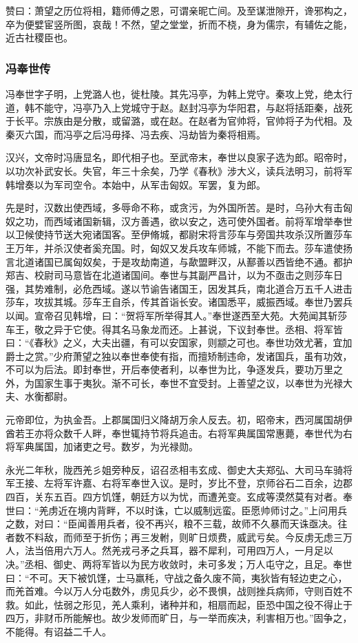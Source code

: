 \documentclass[]{article}
\begin{document}
赞曰：萧望之历位将相，籍师傅之恩，可谓亲昵亡间。及至谋泄隙开，谗邪构之，卒为便嬖宦竖所图，哀哉！不然，望之堂堂，折而不桡，身为儒宗，有辅佐之能，近古社稷臣也。

\hypertarget{header-n5539}{%
\subsubsection{冯奉世传}\label{header-n5539}}

冯奉世字子明，上党潞人也，徙杜陵。其先冯亭，为韩上党守。秦攻上党，绝太行道，韩不能守，冯亭乃入上党城守于赵。赵封冯亭为华阳君，与赵将括距秦，战死于长平。宗族由是分散，或留潞，或在赵。在赵者为官帅将，官帅将子为代相。及秦灭六国，而冯亭之后冯毋择、冯去疾、冯劫皆为秦将相焉。

汉兴，文帝时冯唐显名，即代相子也。至武帝末，奉世以良家子选为郎。昭帝时，以功次补武安长。失官，年三十余矣，乃学《春秋》涉大义，读兵法明习，前将军韩增奏以为军司空令。本始中，从军击匈奴。军罢，复为郎。

先是时，汉数出使西域，多辱命不称，或贪污，为外国所苦。是时，乌孙大有击匈奴之功，而西域诸国新辑，汉方善遇，欲以安之，选可使外国者。前将军增举奉世以卫候使持节送大宛诸国客。至伊脩城，都尉宋将言莎车与旁国共攻杀汉所置莎车王万年，并杀汉使者奚充国。时，匈奴又发兵攻车师城，不能下而去。莎车遣使扬言北道诸国已属匈奴矣，于是攻劫南道，与歃盟畔汉，从鄯善以西皆绝不通。都护郑吉、校尉司马意皆在北道诸国间。奉世与其副严昌计，以为不亟击之则莎车日强，其势难制，必危西域。遂以节谕告诸国王，因发其兵，南北道合万五千人进击莎车，攻拔其城。莎车王自杀，传其首诣长安。诸国悉平，威振西域。奉世乃罢兵以闻。宣帝召见韩增，曰：``贺将军所举得其人。''奉世遂西至大苑。大苑闻其斩莎车王，敬之异于它使。得其名马象龙而还。上甚说，下议封奉世。丞相、将军皆曰：``《春秋》之义，大夫出疆，有可以安国家，则颛之可也。奉世功效尤著，宜加爵士之赏。''少府萧望之独以奉世奉使有指，而擅矫制违命，发诸国兵，虽有功效，不可以为后法。即封奉世，开后奉使者利，以奉世为比，争逐发兵，要功万里之外，为国家生事于夷狄。渐不可长，奉世不宜受封。上善望之议，以奉世为光禄大夫、水衡都尉。

元帝即位，为执金吾。上郡属国归义降胡万余人反去。初，昭帝末，西河属国胡伊酋若王亦将众数千人畔，奉世辄持节将兵追击。右将军典属国常惠薨，奉世代为右将军典属国，加诸吏之号。数岁，为光禄勋。

永光二年秋，陇西羌彡姐旁种反，诏召丞相韦玄成、御史大夫郑弘、大司马车骑将军王接、左将军许嘉、右将军奉世入议。是时，岁比不登，京师谷石二百余，边郡四百，关东五百。四方饥馑，朝廷方以为忧，而遭羌变。玄成等漠然莫有对者。奉世曰：``羌虏近在境内背畔，不以时诛，亡以威制远蛮。臣愿帅师讨之。''上问用兵之数，对曰：``臣闻善用兵者，役不再兴，粮不三载，故师不久暴而天诛亟决。往者数不料敌，而师至于折伤；再三发軵，则旷日烦费，威武亏矣。今反虏无虑三万人，法当倍用六万人。然羌戎弓矛之兵耳，器不犀利，可用四万人，一月足以决。''丞相、御史、两将军皆以为民方收敛时，未可多发；万人屯守之，且足。奉世曰：``不可。天下被饥馑，士马羸秏，守战之备久废不简，夷狄皆有轻边吏之心，而羌首难。今以万人分屯数外，虏见兵少，必不畏惧，战则挫兵病师，守则百姓不救。如此，怯弱之形见，羌人乘利，诸种并和，相扇而起，臣恐中国之役不得止于四万，非财币所能解也。故少发师而旷日，与一举而疾决，利害相万也。''固争之，不能得。有诏益二千人。
\end{document}
